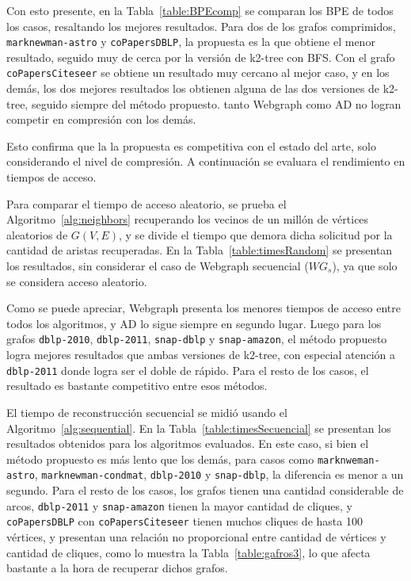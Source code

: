 Con esto presente, en la Tabla~\ref{table:BPEcomp} se comparan los BPE de todos los casos, resaltando los mejores resultados. Para dos de los grafos comprimidos, \texttt{marknewman-astro} y \texttt{coPapersDBLP}, la propuesta es la que obtiene el menor resultado, seguido muy de cerca por la versión de k2-tree con BFS. Con el grafo \texttt{coPapersCiteseer} se obtiene un resultado muy cercano al mejor caso, y en los demás, los dos mejores resultados los obtienen alguna de las dos versiones de k2-tree, seguido siempre del método propuesto. tanto Webgraph como AD no logran competir en compresión con los demás.

Esto confirma que la la propuesta es competitiva con el estado del arte, solo considerando el nivel de compresión. A continuación se evaluara el rendimiento en tiempos de acceso.



Para comparar el tiempo de acceso aleatorio, se prueba el Algoritmo~\ref{alg:neighbors} recuperando los vecinos de un millón de vértices aleatorios de $G(V, E)$, y se divide el tiempo que demora dicha solicitud por la cantidad de aristas recuperadas. En la Tabla~\ref{table:timesRandom} se presentan los resultados, sin considerar el caso de Webgraph secuencial ($WG_{s}$), ya que solo se considera acceso aleatorio. 

Como se puede apreciar, Webgraph presenta los menores tiempos de acceso entre todos los algoritmos, y AD lo sigue siempre en segundo lugar. Luego para los grafos \texttt{dblp-2010}, \texttt{dblp-2011}, \texttt{snap-dblp} y \texttt{snap-amazon}, el método propuesto logra mejores resultados que ambas versiones de k2-tree, con especial atención a \texttt{dblp-2011} donde logra ser el doble de rápido. Para el resto de los casos, el resultado es bastante competitivo entre esos métodos.



El tiempo de reconstrucción secuencial se midió usando el Algoritmo~\ref{alg:sequential}. En la Tabla~\ref{table:timesSecuencial} se presentan los resultados obtenidos para los algoritmos evaluados. En este caso, si bien el método propuesto es más lento que los demás, para casos como \texttt{marknweman-astro}, \texttt{marknewman-condmat}, \texttt{dblp-2010} y \texttt{snap-dblp}, la diferencia es menor a un segundo. Para el resto de los casos, los grafos tienen una cantidad considerable de arcos, \texttt{dblp-2011} y \texttt{snap-amazon} tienen la mayor cantidad de cliques, y \texttt{coPapersDBLP} con \texttt{coPapersCiteseer} tienen muchos cliques de hasta 100 vértices, y presentan una relación no proporcional entre cantidad de vértices y cantidad de cliques, como lo muestra la Tabla~\ref{table:gafros3}, lo que afecta bastante a la hora de recuperar dichos grafos.

